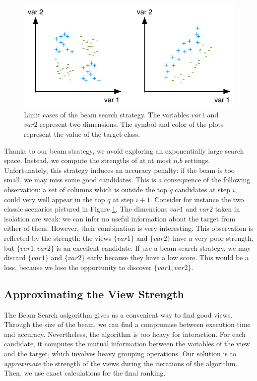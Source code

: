 \begin{figure}[t!]
\centering
\includegraphics[width=0.8\columnwidth]{images/strength-jump}
\caption{Limit cases of the beam search strategy. The variables $var1$ and
$var2$ represent two dimensions. The symbol and color of the plots represent
the value of the target class. }
\label{pic:strength-jump}
\end{figure}
Thanks to our beam strategy, we avoid exploring an exponentially large search
space. Instead, we compute the strengths of at at most $n.b$ settings.
Unfortunately, this strategy induces an accuracy penalty: if the beam is too
small, we may miss some good candidates. This is a consequence of the following
observation: a set of columns which is outside the top $q$ candidates at step
$i$, could very well appear in the top $q$ at step $i+1$. Consider for instance
the two classic scenarios pictured in Figure \ref{pic:strength-jump}. The
dimensions $var1$ and $var2$ taken in isolation are weak: we can infer no
useful information about the target from either of them. However, their
combination is very interesting.  This observation is reflected by the
strength: the views $\{var1\}$ and $\{var2\}$ have a very poor strength, but
$\{var1, var2\}$ is an excellent candidate. If use a beam search strategy, we
may discard  $\{var1\}$ and $\{var2\}$ early because they have a low score.
This would be a loss, because we lose the opportunity to discover $\{var1,
var2\}$.

\subsection{Approximating the View Strength}
\label{sec:approx}

The Beam Search aslgorithm gives us a convenient way to find good views.
Through the size of the beam, we can find a compromise between execution time
and accuracy.  Nevertheless, the algorithm is too heavy for interaction. For
each candidate, it computes the mutual information between the variables of the
view and the target, which involves heavy grouping operations. Our solution is
to \emph{approximate} the strength of the views during the iterations of the
algorithm. Then, we use exact calculations for the final ranking.

